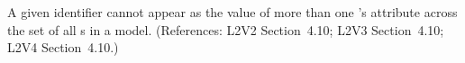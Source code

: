 A given identifier cannot appear as the value of more than one
\InitialAssignment{}'s  attribute across
the set of all \InitialAssignment{}s in a model.  (References:
L2V2 Section~4.10; L2V3
Section~4.10; L2V4 Section~4.10.)
